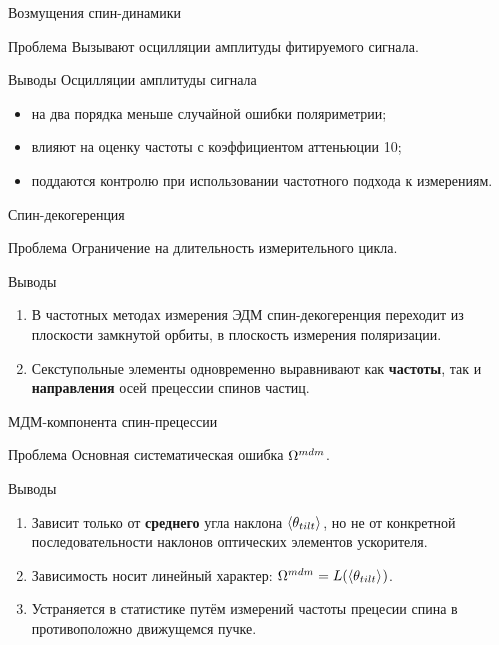 \documentclass[14pt]{beamer}
\newcommand{\Wmdm}{\W^{mdm}}
\begin{document}
\begin{frame}{Возмущения спин-динамики}
	\begin{block}{Проблема}
		Вызывают осцилляции амплитуды фитируемого сигнала.
	\end{block}
	\begin{block}{Выводы}
		Осцилляции амплитуды сигнала
		\begin{itemize}
			\item на два порядка меньше случайной ошибки поляриметрии;
			\item влияют на оценку частоты с коэффициентом аттеньюции 10;
			\item поддаются контролю при использовании частотного подхода к измерениям.
		\end{itemize}
	\end{block}
\end{frame}
\begin{frame}{Спин-декогеренция}
	\begin{block}{Проблема}
		Ограничение на длительность измерительного цикла.
	\end{block}
	\begin{block}{Выводы}
		\begin{enumerate}
			\item В частотных методах измерения ЭДМ спин-декогеренция переходит из плоскости замкнутой орбиты, в плоскость измерения поляризации.
			\item Секступольные элементы одновременно выравнивают как \textbf{частоты}, так и \textbf{направления} осей прецессии спинов частиц.
		\end{enumerate}
	\end{block}
\end{frame}
\begin{frame}{МДМ-компонента спин-прецессии}
	\begin{block}{Проблема}
		Основная систематическая ошибка $\Wmdm$.
	\end{block}
	\begin{block}{Выводы}
		\begin{enumerate}
			\item Зависит только от \textbf{среднего} угла наклона $\avg{\theta_{tilt}}$, но не от конкретной последовательности наклонов оптических элементов ускорителя.
			\item Зависимость носит линейный характер: $\Wmdm = L(\avg{\theta_{tilt}})$.
			\item Устраняется в статистике путём измерений частоты прецесии спина в противоположно движущемся пучке.
		\end{enumerate}
	\end{block}
\end{frame}
\end{document}
